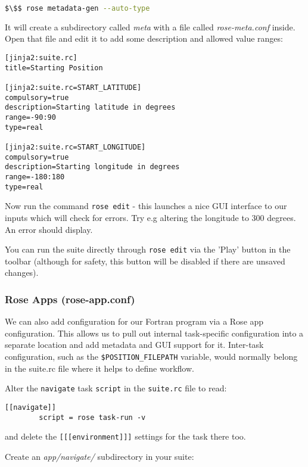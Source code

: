 \begin{lstlisting}[mathescape, language=bash]
$\$$ rose metadata-gen --auto-type
\end{lstlisting}

It will create a subdirectory called {\em meta} with a file called {\em rose-meta.conf} inside. Open that file and edit it to add some description and allowed value ranges:

\lstset{language=suiterc}
\begin{lstlisting}[columns=fullflexible]
[jinja2:suite.rc]
title=Starting Position

[jinja2:suite.rc=START_LATITUDE]
compulsory=true
description=Starting latitude in degrees
range=-90:90
type=real

[jinja2:suite.rc=START_LONGITUDE]
compulsory=true
description=Starting longitude in degrees
range=-180:180
type=real
\end{lstlisting}
 
Now run the command \lstinline{rose edit} - this launches a nice GUI interface to our inputs which will check for errors. Try e.g altering the longitude to 300 degrees. An error should display.

You can run the suite directly through \lstinline{rose edit} via the 'Play' button in the toolbar (although for safety, this button will be disabled if there are unsaved changes).

\subsubsection{Rose Apps (rose-app.conf)}

We can also add configuration for our Fortran program via a Rose app configuration. This allows us to pull out internal task-specific configuration into a separate location and add metadata and GUI support for it. Inter-task configuration, such as the \lstinline{$POSITION_FILEPATH} variable, would normally belong in the suite.rc file where it helps to define workflow.

Alter the \lstinline{navigate} task \lstinline{script} in the \lstinline{suite.rc} file to read:
\lstset{language=suiterc}
\begin{lstlisting}[columns=fullflexible]
    [[navigate]]
        script = rose task-run -v
\end{lstlisting}

and delete the \lstinline{[[[environment]]]} settings for the task there too.

Create an {\em app/navigate/} subdirectory in your suite:

